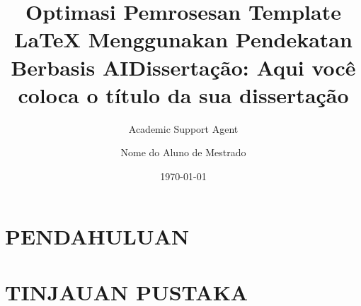 \documentclass{mythesis}
\title{Optimasi Pemrosesan Template LaTeX Menggunakan Pendekatan Berbasis AI}
\author{Academic Support Agent}
\date{\today}
\begin{document}
\maketitle

\begin{abstract}

\end{abstract}

\chapter{PENDAHULUAN}


\chapter{TINJAUAN PUSTAKA}


\usepackage{thesis}
\usepackage[full,round]{harvard}
\usepackage[algochapter,algoruled,linesnumbered,vlined,portugues]{algorithm2e}
\usepackage{graphicx}
\usepackage{latexsym}
\usepackage{amssymb,amsmath,amstext,amscd}
\usepackage{amsthm}
\usepackage{fancyhdr,fancybox}
\usepackage{psfrag}
\usepackage{rotating}
\usepackage[brazilian]{babel}
\usepackage{url}
\usepackage{hyperref}
\usepackage{listings}
\usepackage{epstopdf}
\usepackage{makeidx}
\usepackage{authorindex}


\makeindex

%

\makeatletter
{}
\makeatother

\title{Dissertação: Aqui você coloca o título da sua dissertação}
\author{Nome do Aluno de Mestrado}
\end{document}
